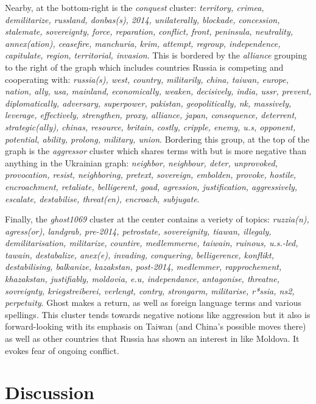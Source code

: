 \documentclass[doublespacing]{utdthesis}
\begin{document}
Nearby, at the bottom-right is the \emph{conquest} cluster: \emph{territory, crimea, demilitarize, russland, donbas(s), 2014, unilaterally, blockade, concession, stalemate, sovereignty, force, reparation, conflict, front, peninsula, neutrality, annex(ation), ceasefire, manchuria, krim, attempt, regroup, independence, capitulate, region, territorial, invasion}.
This is bordered by the \emph{alliance} grouping to the right of the graph which includes countries Russia is competing and cooperating with: \emph{russia(s), west, country, militarily, china, taiwan, europe, nation, ally, usa, mainland, economically, weaken, decisively, india, ussr, prevent, diplomatically, adversary, superpower, pakistan, geopolitically, nk, massively, leverage, effectively, strengthen, proxy, alliance, japan, consequence, deterrent, strategic(ally), chinas, resource, britain, costly, cripple, enemy, u.s, opponent, potential, ability, prolong, military, union}.
Bordering this group, at the top of the graph is the \emph{aggressor} cluster which shares terms with but is more negative than anything in the Ukrainian graph: \emph{neighbor, neighbour, deter, unprovoked, provocation, resist, neighboring, pretext, sovereign, embolden, provoke, hostile, encroachment, retaliate, belligerent, goad, agression, justification, aggressively, escalate, destabilise, threat(en), encroach, subjugate}.

Finally, the \emph{ghost1069} cluster at the center contains a veriety of topics: \emph{ruzzia(n), agress(or), landgrab, pre-2014, petrostate, sovereignity, tiawan, illegaly, demilitarisation, militarize, countire, medlemmerne, taiwain, ruinous, u.s.-led, tawain, destabalize, anex(e), invading, conquering, belligerence, konflikt, destabilising, balkanize, kazakstan, post-2014, medlemmer, rapprochement, khazakstan, justifiably, moldovia, e.u, independance, antagonise, threatne, sovreignty, kriegstreiberei, verlengt, contry, strongarm, militarise, r*ssia, ns2, perpetuity}.
Ghost makes a return, as well as foreign language terms and various spellings.
This cluster tends towards negative notions like aggression but it also is forward-looking with its emphasis on Taiwan (and China's possible moves there) as well as other countries that Russia has shown an interest in like Moldova.
It evokes fear of ongoing conflict.

\section{Discussion}
\end{document}
